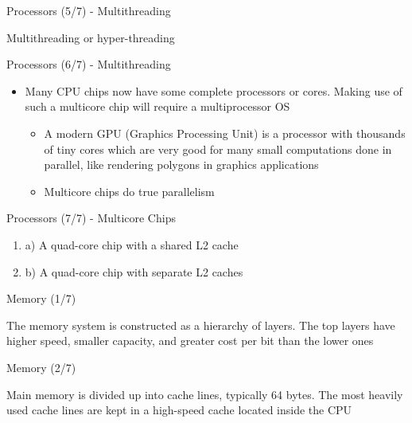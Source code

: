 \documentclass{beamer}
\begin{document}
\begin{frame}
{\centerline{Processors (5/7) - Multithreading}}
Multithreading or hyper-threading
\begin{figure}
    \centering
    
\end{figure}
\end{frame}


\begin{frame}
{\centerline{Processors (6/7) - Multithreading}}
\begin{itemize}
    \item Many CPU chips now have some complete processors or cores. Making use of such a multicore chip will require a multiprocessor OS
    \begin{itemize}
        \item A modern GPU (Graphics Processing Unit) is a processor with thousands of tiny cores which are very good for many small computations done in parallel, like rendering polygons in graphics applications
        \item Multicore chips do true parallelism
    \end{itemize}
\end{itemize}
\end{frame}


\begin{frame}
{\centerline{Processors (7/7) - Multicore Chips}}
\begin{enumerate}[label=(\Alph*)]
    \item a) A quad-core chip with a shared L2 cache
    \item b) A quad-core chip with separate L2 caches
\end{enumerate}

\centering

\end{frame}


\begin{frame}
{\centerline{Memory (1/7)}}
The memory system is  constructed as a hierarchy of layers. The top layers have higher speed, smaller capacity, and greater cost per bit than the lower ones
\begin{figure}
    \centering
    
\end{figure}
\end{frame}


\begin{frame}
{\centerline{Memory (2/7)}}
Main memory is divided up into cache lines, typically 64 bytes. The most heavily used cache lines are kept in a high-speed cache located inside the CPU
\end{frame}
\end{document}
